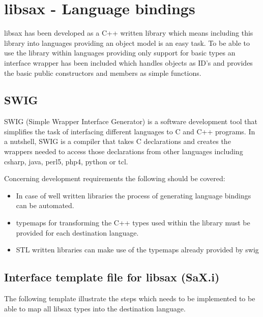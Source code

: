 \chapter{libsax - Language bindings}
\minitoc

libsax has been developed as a C++ written library which means
including this library into languages providing an object model
is an easy task. To be able to use the library within languages
providing only support for basic types an interface wrapper has
been included which handles objects as ID's and provides the basic
public constructors and members as simple functions.

\section{SWIG}

SWIG (Simple Wrapper Interface Generator) is a software development tool
that simplifies the task of
interfacing different languages to C and C++ programs. In a nutshell,
SWIG is a compiler that takes C declarations and creates the wrappers
needed to access those declarations from other languages
including csharp, java, perl5, php4, python or tcl.

Concerning development requirements the following should be covered:

\begin{itemize}
\item In case of well written libraries the process of generating
      language bindings can be automated.
\item typemaps for transforming the C++ types used within the library
      must be provided for each destination language.
\item STL written libraries can make use of the typemaps already
      provided by swig
\end{itemize}

\newpage

\section{Interface template file for libsax (SaX.i)}

The following template illustrate the steps which needs to be
implemented to be able to map all libsax types into the destination
language.

